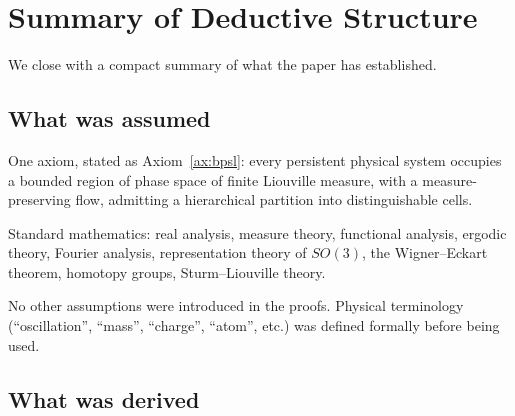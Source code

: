 \documentclass[11pt,twocolumn,a4paper]{article}
\theoremstyle{axiomstyle}
\theoremstyle{conseqstyle}
\theoremstyle{definition}
\theoremstyle{remark}
\begin{document}
\section{Summary of Deductive Structure}
\label{sec:summarystruct}

We close with a compact summary of what the paper has established.

\subsection{What was assumed}

One axiom, stated as Axiom~\ref{ax:bpsl}: every persistent physical system occupies a bounded region of phase space of finite Liouville measure, with a measure-preserving flow, admitting a hierarchical partition into distinguishable cells.

Standard mathematics: real analysis, measure theory, functional analysis, ergodic theory, Fourier analysis, representation theory of $SO(3)$, the Wigner--Eckart theorem, homotopy groups, Sturm--Liouville theory.

No other assumptions were introduced in the proofs. Physical terminology (``oscillation'', ``mass'', ``charge'', ``atom'', etc.) was defined formally before being used.

\subsection{What was derived}
\end{document}
